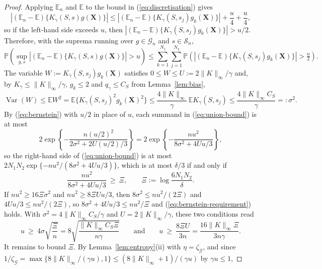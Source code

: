 \documentclass{article} %
\begin{document}
\begin{proof}
Applying $\mathbb{E}_n$ and $\mathbb{E}$ to the bound in (\ref{eq:discretisation}) gives
\[
  \left|(\mathbb{E}_n-\mathbb{E})\{K_{\gamma}(S,s)g(\mathbf{X})\}\right|
  \le\left|(\mathbb{E}_n-\mathbb{E})\{K_{\gamma}(S,s_j)g_k(\mathbf{X})\}\right|
    +\frac{u}{4}+\frac{u}{4} ,
\]
so if the left-hand side exceeds $u$, then $|(\mathbb{E}_n-\mathbb{E})\{K_{\gamma}(S,s_j)g_k(\mathbf{X})\}|>u/2$.  Therefore, with the suprema running over $g\in\mathcal{G}_n$ and $s\in\mathcal{S}_n$,
\begin{equation}
  \mathbb{P}\left(
    \sup_{g,s}
    \left|(\mathbb{E}_n-\mathbb{E})\{K_{\gamma}(S,s)g(\mathbf{X})\}\right|>u
  \right)
  \le\sum_{k=1}^{N_1}\sum_{j=1}^{N_2}
    \mathbb{P}\left(
      \left|(\mathbb{E}_n-\mathbb{E})\{K_{\gamma}(S,s_j)g_k(\mathbf{X})\}\right|
      >\tfrac{u}{2}\right).
  \label{eq:union-bound}
\end{equation}
The variable $W:=K_{\gamma}(S,s_j)g_k(\mathbf{X})$ satisfies $0\le W\le U:=2\lVert K\rVert_\infty/\gamma$ and, by $K_{\gamma}\le\lVert K\rVert_\infty/\gamma$, $g_k\le2$ and $q_{\gamma}\le C_S$ from Lemma~\ref{lem:bias},
\[
  \operatorname{Var}(W)\le\mathbb{E}W^2
  =\mathbb{E}\{K_{\gamma}(S,s_j)^2g_k(\mathbf{X})^2\}
  \le\frac{4\lVert K\rVert_\infty}{\gamma}\,\mathbb{E}K_{\gamma}(S,s_j)
  \le\frac{4\lVert K\rVert_\infty C_S}{\gamma}=:\sigma^2 .
\]
By (\ref{eq:bernstein}) with $u/2$ in place of $u$, each summand in (\ref{eq:union-bound}) is at most
\[
  2\exp\left\{-\frac{n(u/2)^2}{2\sigma^2+2U(u/2)/3}\right\}
  =2\exp\left\{-\frac{nu^2}{8\sigma^2+4Uu/3}\right\} ,
\]
so the right-hand side of (\ref{eq:union-bound}) is at most $2N_1N_2\exp\{-nu^2/(8\sigma^2+4Uu/3)\}$, which is at most $\delta/3$ if and only if
\begin{equation}
  \frac{nu^2}{8\sigma^2+4Uu/3}\ \ge\ \Xi,
  \qquad
  \Xi:=\log\frac{6N_1N_2}{\delta} .
  \label{eq:bernstein-requirement}
\end{equation}
If $nu^2\ge16\Xi\sigma^2$ and $nu^2\ge8\Xi Uu/3$, then $8\sigma^2\le nu^2/(2\Xi)$ and $4Uu/3\le nu^2/(2\Xi)$, so $8\sigma^2+4Uu/3\le nu^2/\Xi$ and (\ref{eq:bernstein-requirement}) holds.  With $\sigma^2=4\lVert K\rVert_\infty C_S/\gamma$ and $U=2\lVert K\rVert_\infty/\gamma$, these two conditions read
\begin{equation}
  u\ \ge\ 4\sigma\sqrt{\frac{\Xi}{n}}
  =8\sqrt{\frac{\lVert K\rVert_\infty C_S\Xi}{n\gamma}}
  \qquad\text{and}\qquad
  u\ \ge\ \frac{8\Xi U}{3n}
  =\frac{16\lVert K\rVert_\infty\Xi}{3n\gamma} .
  \label{eq:u-requirement}
\end{equation}
It remains to bound $\Xi$.  By Lemma~\ref{lem:entropy}(ii) with $\eta=\zeta_{\mathcal{G}}$, and since $1/\zeta_{\mathcal{G}}=\max\{8\lVert K\rVert_\infty/(\gamma u),1\}\le(8\lVert K\rVert_\infty+1)/(\gamma u)$ by $\gamma u\le1$,

\end{proof}
\end{document}
